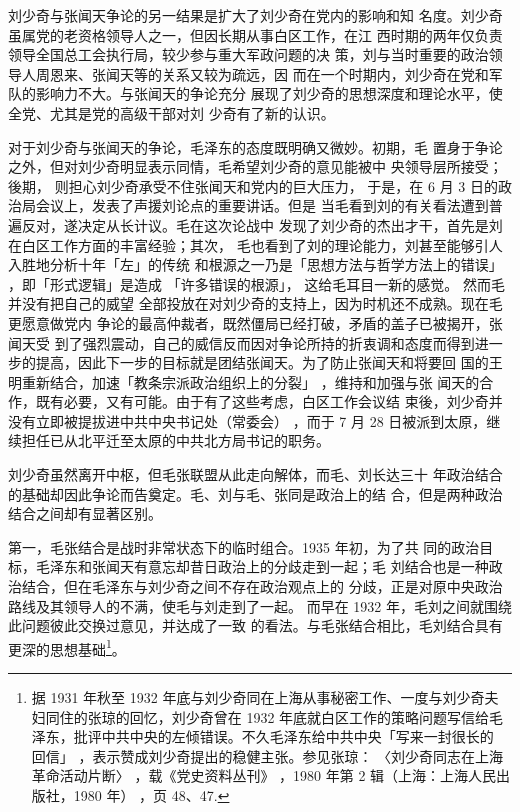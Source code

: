 刘少奇与张闻天争论的另一结果是扩大了刘少奇在党内的影响和知
名度。刘少奇虽属党的老资格领导人之一，但因长期从事白区工作，在江
西时期的两年仅负责领导全国总工会执行局，较少参与重大军政问题的决
策，刘与当时重要的政治领导人周恩来、张闻天等的关系又较为疏远，因
而在一个时期内，刘少奇在党和军队的影响力不大。与张闻天的争论充分
展现了刘少奇的思想深度和理论水平，使全党、尤其是党的高级干部对刘
少奇有了新的认识。

对于刘少奇与张闻天的争论，毛泽东的态度既明确又微妙。初期，毛
置身于争论之外，但对刘少奇明显表示同情，毛希望刘少奇的意见能被中
央领导层所接受；
後期，
则担心刘少奇承受不住张闻天和党内的巨大压力，
于是，在 6 月 3 日的政治局会议上，发表了声援刘论点的重要讲话。但是
当毛看到刘的有关看法遭到普遍反对，遂决定从长计议。毛在这次论战中
发现了刘少奇的杰出才干，首先是刘在白区工作方面的丰富经验；其次，
毛也看到了刘的理论能力，刘甚至能够引人入胜地分析十年「左」的传统
和根源之一乃是「思想方法与哲学方法上的错误」
，即「形式逻辑」是造成
「许多错误的根源」， 这给毛耳目一新的感觉。
然而毛并没有把自己的威望
全部投放在对刘少奇的支持上，因为时机还不成熟。现在毛更愿意做党内
争论的最高仲裁者，既然僵局已经打破，矛盾的盖子已被揭开，张闻天受
到了强烈震动，自己的威信反而因对争论所持的折衷调和态度而得到进一
步的提高，因此下一步的目标就是团结张闻天。为了防止张闻天和将要回
国的王明重新结合，加速「教条宗派政治组织上的分裂」
，维持和加强与张
闻天的合作，既有必要，又有可能。由于有了这些考虑，白区工作会议结
束後，刘少奇并没有立即被提拔进中共中央书记处（常委会） ，而于 7 月
28 日被派到太原，继续担任已从北平迁至太原的中共北方局书记的职务。

刘少奇虽然离开中枢，但毛张联盟从此走向解体，而毛、刘长达三十
年政治结合的基础却因此争论而告奠定。毛、刘与毛、张同是政治上的结
合，但是两种政治结合之间却有显著区别。

第一，毛张结合是战时非常状态下的临时组合。1935 年初，为了共
同的政治目标，毛泽东和张闻天有意忘却昔日政治上的分歧走到一起；毛
刘结合也是一种政治结合，但在毛泽东与刘少奇之间不存在政治观点上的
分歧，正是对原中央政治路线及其领导人的不满，使毛与刘走到了一起。
而早在 1932 年，毛刘之间就围绕此问题彼此交换过意见，并达成了一致
的看法。与毛张结合相比，毛刘结合具有更深的思想基础\footnote{据 1931 年秋至 1932 年底与刘少奇同在上海从事秘密工作、一度与刘少奇夫妇同住的张琼的回忆，刘少奇曾在
1932 年底就白区工作的策略问题写信给毛泽东，批评中共中央的左倾错误。不久毛泽东给中共中央「写来一封很长的
回信」
，表示赞成刘少奇提出的稳健主张。参见张琼：
〈刘少奇同志在上海革命活动片断〉
，载《党史资料丛刊》
，1980
年第 2 辑（上海：上海人民出版社，1980 年）
，页 48、47.}。

